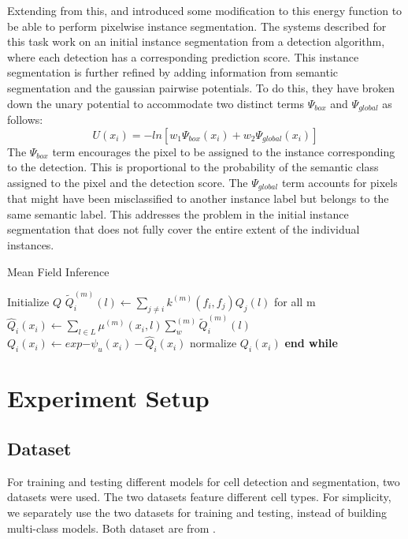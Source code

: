 \documentclass[journal]{IEEEtran}
\begin{document}
Extending from this, \cite{Arnab2017PixelwiseIS} and \cite{Li_2018_ECCV} introduced some modification to this energy function to be able to perform  pixelwise instance segmentation. The systems described for this task work on an initial instance segmentation from a detection algorithm, where each detection has a corresponding prediction score. This instance segmentation is further refined by adding information from semantic segmentation and the gaussian pairwise potentials. To do this, they have broken down the unary potential to accommodate two distinct terms $\Psi_{box}$ and $\Psi_{global}$ as follows:
\begin{equation}
U(x_i) = -ln[w_1\Psi_{box}(x_i) + w_2\Psi_{global}(x_i)]
\end{equation}
The $\Psi_{box}$ term encourages the pixel to be assigned to the instance corresponding to the detection. This is proportional to the probability of the semantic class assigned to the pixel and the detection score. The $\Psi_{global}$ term accounts for pixels that might have been misclassified to another instance label but belongs to the same semantic label. This addresses the problem in the initial instance segmentation that does not fully cover the entire extent of the individual instances.
\begin{algorithm*}
\caption{Mean Field Inference}\label{alg:meanfieldinference}
\begin{algorithmic}[1]
\State Initialize $Q$
\State $\widetilde{Q}_i^{(m)}(l)\gets \sum_{j\neq i}k^{(m)}(f_i,f_j)Q_j(l)$ for all m
\State $\hat{Q}_i(x_i)\gets \sum_{l \in L} \mu^{(m)}(x_i,l)\sum_w^{(m)}\widetilde{Q}_i^{(m)}(l)$
\State $Q_i(x_i)\gets exp{-\psi_u(x_i) - \hat{Q}_i(x_i)}$
\State normalize $Q_i(x_i)$
\EndWhile
\State \textbf{end while}
\end{algorithmic}
\end{algorithm*}

\section{Experiment Setup}
\subsection{Dataset}
For training and testing different models for cell detection and segmentation, two datasets were used. The two datasets feature different cell types. For simplicity, we separately use the two datasets for training and testing, instead of building multi-class models. Both dataset are from \cite{waithe_dominic_2019_2632769}.
\end{document}
